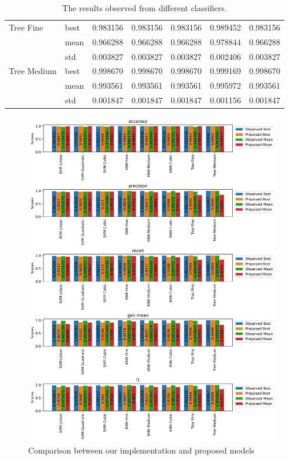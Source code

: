 \begin{table}
\begin{tabular}{llrrrrr}
        Tree Fine     & best   & 0.983156 & 0.983156  & 0.983156 & 0.989452 & 0.983156 \\
                      & mean   & 0.966288 & 0.966288  & 0.966288 & 0.978844 & 0.966288 \\
                      & std    & 0.003827 & 0.003827  & 0.003827 & 0.002406 & 0.003827 \\
        Tree Medium   & best   & 0.998670 & 0.998670  & 0.998670 & 0.999169 & 0.998670 \\
                      & mean   & 0.993561 & 0.993561  & 0.993561 & 0.995972 & 0.993561 \\
                      & std    & 0.001847 & 0.001847  & 0.001847 & 0.001156 & 0.001847 \\
        \bottomrule
    \end{tabular}
    \caption{The results observed from different classifiers.}
    \label{tab: observed result}
\end{table}

\begin{figure}
    \includegraphics[width=\linewidth]{Appendices/observations.png}
    \caption{Comparison between our implementation and proposed models}
    \label{fig: comparison}
\end{figure}

